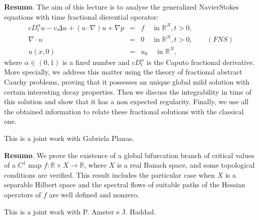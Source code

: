 	\noindent\textbf{Resumo}.\label{pmcn} 
	The aim of this lecture is to analyse the generalized NavierStokes equations with time fractional dierential operator:
	\begin{eqnarray*}
	cD^\alpha_t u-v\Delta u+(u \cdot \nabla)u+\nabla p &=& f \quad \mbox{ in } \mathbb{R}^N , t >0,\\
	\nabla\cdot u &=& 0  \quad \mbox{ in } \mathbb{R}^N , t>0, \qquad (FNS)\\
	u(x,0) &=& u_0 \quad \mbox{ in } \mathbb{R}^N ,
	\end{eqnarray*}
	where $\alpha \in (0, 1)$ is a fixed number and $cD^\alpha_t$ is the Caputo fractional derivative. More specially, we address this matter using the theory of fractional abstract Cauchy problems, proving that it possesses an unique global mild solution with certain interesting decay properties. Then we discuss the integrability in time of this solution and show that it has a non expected regularity. Finally, we use all the obtained information to relate these fractional solutions with the classical one.

	\vspace*{0.5cm} \noindent This is a joint work with Gabriela Planas.
	
	\vspace{24pt}
	
	
	\noindent\textbf{Resumo}.\label{pb} 
	We prove the existence of a global bifurcation branch of critical values of a $C^1$ map $f : \mathbb{R} \times X \to \mathbb{R}$, where $X$ is a real Banach space, and some topological conditions are verified. This result includes the particular case when $X$ is a separable Hilbert space and the spectral flows of suitable paths of the Hessian operators of $f$ are well defined and nonzero. 

	\vspace*{0.5cm} \noindent This is a joint work with P. Amster e J. Haddad.
	
	\vspace{24pt}
	
